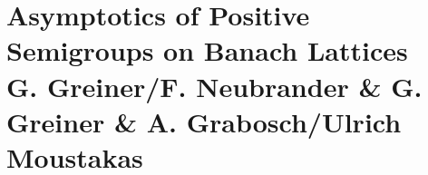 
\chapter{Asymptotics of Positive Semigroups on Banach Lattices \\
G. Greiner/F. Neubrander \& G. Greiner \& A. Grabosch/Ulrich Moustakas}\label{chap:C-IV}
